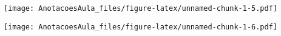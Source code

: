 \documentclass[
]{article}
\newenvironment{Shaded}{\begin{snugshade}}{\end{snugshade}}
\newcommand{\DataTypeTok}[1]{\textcolor[rgb]{0.13,0.29,0.53}{#1}}
\newcommand{\DecValTok}[1]{\textcolor[rgb]{0.00,0.00,0.81}{#1}}
\newcommand{\KeywordTok}[1]{\textcolor[rgb]{0.13,0.29,0.53}{\textbf{#1}}}
\newcommand{\NormalTok}[1]{#1}
\newcommand{\OperatorTok}[1]{\textcolor[rgb]{0.81,0.36,0.00}{\textbf{#1}}}
\newcommand{\StringTok}[1]{\textcolor[rgb]{0.31,0.60,0.02}{#1}}
\begin{document}
\texttt{[image: AnotacoesAula\_files/figure-latex/unnamed-chunk-1-5.pdf]}

\begin{Shaded}
\end{Shaded}

\texttt{[image: AnotacoesAula\_files/figure-latex/unnamed-chunk-1-6.pdf]}
\end{document}
